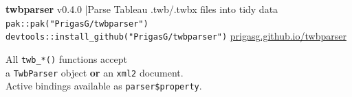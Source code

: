 \documentclass[10pt,landscape]{article}
\newcommand{\pkg}[1]{\texttt{\color{twbGreen}#1}}
\begin{document}

\begin{tcolorbox}[
  colback=twbBlue, colframe=twbBlue,
  coltext=white, arc=3pt,
  top=4pt, bottom=4pt, left=6pt, right=6pt,
  before skip=0pt, after skip=4pt
]
  \begin{minipage}{0.72\linewidth}
    {\Large\bfseries twbparser}\quad
    {\normalsize\color{twbLight} v0.4.0 \quad|\quad Parse Tableau .twb/.twbx files into tidy data}\\[1pt]
    {\scriptsize\color{twbLight}%
      \texttt{pak::pak("PrigasG/twbparser")} \quad
      \texttt{devtools::install\_github("PrigasG/twbparser")} \quad
      \href{https://prigasg.github.io/twbparser/}{prigasg.github.io/twbparser}}
  \end{minipage}%
  \hfill
  \begin{minipage}{0.26\linewidth}\raggedleft
    {\scriptsize\color{twbLight}
      All \texttt{twb\_*()} functions accept\\
      a \pkg{TwbParser} object \textbf{or} an \texttt{xml2} document.\\
      Active bindings available as \texttt{parser\$property}.}
  \end{minipage}
\end{tcolorbox}
\end{document}
